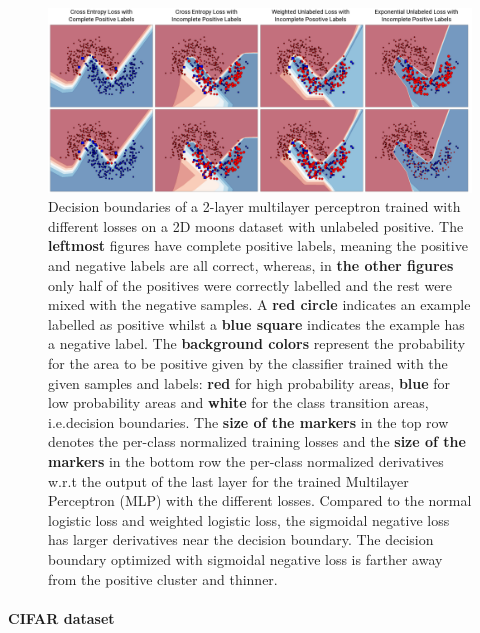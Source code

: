 \begin{figure}
\begin{center}
   \includegraphics[width=0.95\linewidth]{img/moons.png}
\end{center}
   \caption{
   Decision boundaries of a 2-layer multilayer perceptron trained with different losses on a 2D moons dataset with unlabeled positive. The \textbf{leftmost} figures have complete positive labels, meaning the positive and negative labels are all correct, whereas, in \textbf{the other figures} only half of the positives were correctly labelled and the rest were mixed with the negative samples. A \textbf{red circle} indicates an example labelled as positive whilst a \textbf{blue square} indicates the example has a negative label. The \textbf{background colors} represent the probability for the area to be positive given by the classifier trained with the given samples and labels: \textbf{red} for high probability areas, \textbf{blue} for low probability areas and \textbf{white} for the class transition areas, i.e.decision boundaries. The \textbf{size of the markers} in the top row denotes the per-class normalized training losses and the \textbf{size of the markers} in the bottom row the per-class normalized derivatives w.r.t the output of the last layer for the trained Multilayer Perceptron (MLP) with the different losses.
   Compared to the normal logistic loss and weighted logistic loss, the sigmoidal negative loss has larger derivatives near the decision boundary. The decision boundary optimized with sigmoidal negative loss is farther away from the positive cluster and thinner.
   }
\label{fig:moons}
\end{figure}

\paragraph{CIFAR dataset}

